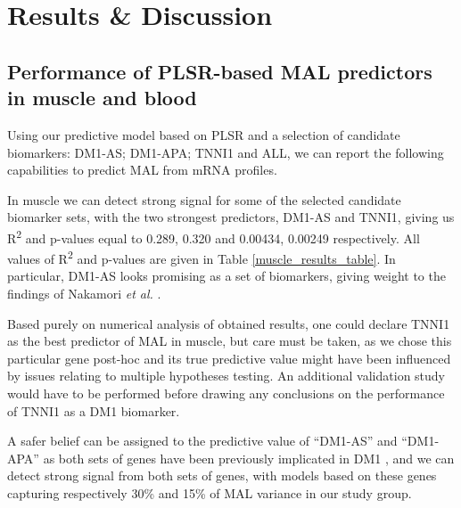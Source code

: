\documentclass[10pt,letterpaper]{article}
\begin{document}


\section*{Results \& Discussion} \label{ResultsDiscussion}

\subsection*{Performance of PLSR-based MAL predictors in muscle and blood} \label{PLSRPerformance}

Using our predictive model based on PLSR and a selection of candidate biomarkers: DM1-AS; DM1-APA; TNNI1 and ALL, we can report the following capabilities to predict MAL from mRNA profiles.

In muscle we can detect strong signal for some of the selected candidate biomarker sets, with the two strongest predictors, DM1-AS and TNNI1, giving us R\textsuperscript{2} and p-values equal to 0.289, 0.320 and 0.00434, 0.00249 respectively. All values of R\textsuperscript{2} and p-values are given in Table \ref{muscle_results_table}. In particular, DM1-AS looks promising as a set of biomarkers, giving weight to the findings of Nakamori {\it et al.} \cite{Nakamori2013}.

Based purely on numerical analysis of obtained results, one could declare TNNI1 as the best predictor of MAL in muscle, but care must be taken, as we chose this particular gene post-hoc and its true predictive value might have been influenced by issues relating to multiple hypotheses testing. An additional validation study would have to be performed before drawing any conclusions on the performance of TNNI1 as a DM1 biomarker.

A safer belief can be assigned to the predictive value of ``DM1-AS'' and ``DM1-APA'' as both sets of genes have been previously implicated in DM1 \cite{Batra2014}, and we can detect strong signal from both sets of genes, with models based on these genes capturing respectively 30\% and 15\% of MAL variance in our study group.
\end{document}
